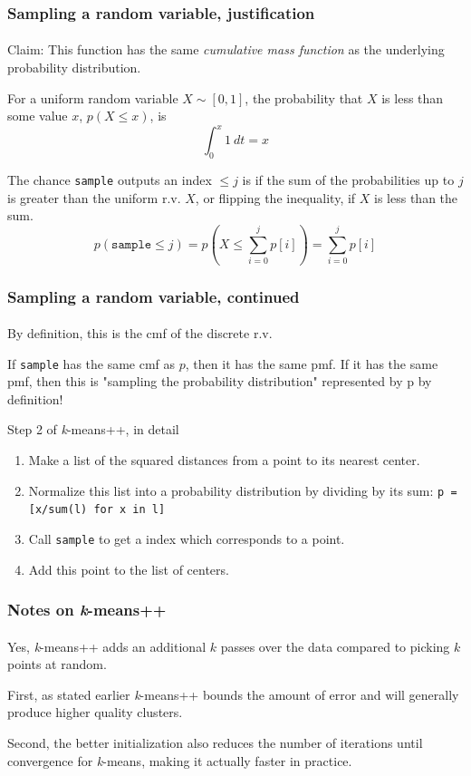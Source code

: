 \documentclass{beamer}                             %
\begin{document}
\begin{frame}
\frametitle{Sampling a random variable, justification}
\framesubtitle{}
Claim: This function has the same \textit{cumulative mass function}
as the underlying probability distribution. \pause

For a uniform random variable \( X \sim [0, 1] \), the probability that
\( X \) is less than some value \( x \), \( p(X \leq x) \), is 
\[ \int^{x}_0 1 \ dt = x \] \pause

The chance \texttt{sample} outputs an index \( \leq j \) is if the sum
of the probabilities up to \( j \) is greater than the uniform r.v. \( X \),
or flipping the inequality, if \( X \) is less than the sum. 
\[p(\texttt{sample} \leq j) =
p(X \leq \sum^{j}_{i = 0} p[i]) = \sum^{j}_{i = 0} p[i] \]  \pause
\end{frame}

\begin{frame}[fragile]
\frametitle{Sampling a random variable, continued}
\framesubtitle{}
By definition, this is the cmf of the discrete r.v. \pause

If \texttt{sample} has the same cmf as \( p \), then it has the same pmf.
If it has the same pmf, then this is "sampling the probability distribution"
represented by p by definition! \pause

\begin{block}{Step 2 of \textit{k}-means++, in detail} 
  \begin{enumerate}
    \item Make a list of the squared distances
      from a point to its nearest center.
    \item Normalize this list into a probability distribution
      by dividing by its sum: \texttt{p = [x/sum(l) for x in l]}
    \item Call \texttt{sample} to get a index which corresponds to a point.
    \item Add this point to the list of centers.
  \end{enumerate}
\end{block}
\end{frame}

\begin{frame}
\frametitle{Notes on \textit{k}-means++}
\framesubtitle{}
Yes, \textit{k}-means++ adds an additional \( k \) passes over the data
compared to picking \( k \) points at random. \pause

First, as stated earlier \textit{k}-means++ bounds the amount of error and will
generally produce higher quality clusters. \pause

Second, the better initialization also reduces the number of iterations until
convergence for \textit{k}-means, making it actually faster in practice.
\end{frame}
\end{document}
